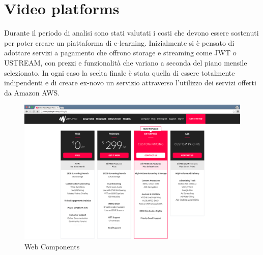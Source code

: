\section{Video platforms}
\label{sec:Video platforms}


Durante il periodo di analisi sono stati valutati i costi che devono essere sostenuti per poter creare un piattaforma di e-learning.
Inizialmente si è pensato di adottare  servizi a pagamento che offrono storage e streaming come JWT o USTREAM, con prezzi e funzionalità che variano a seconda del piano mensile selezionato. In ogni caso la scelta finale è stata quella di essere totalmente indipendenti e di creare ex-novo un servizio attraverso l’utilizzo dei servizi offerti da Amazon AWS.



\begin{figure}[htb]
 \centering
 \includegraphics[width=1.0\linewidth]{images/chapter3/jwtPLayer.png}\hfill
 \caption[Web Components]{Web Components}
 \label{fig:fourV}
\end{figure}

